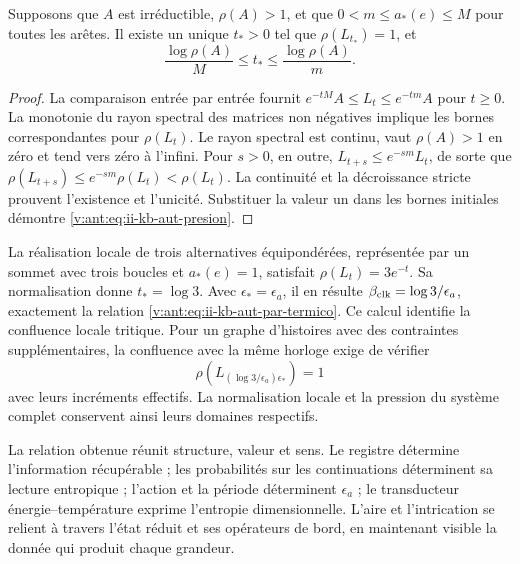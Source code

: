 \begin{proposition}
Supposons que \(A\) est irréductible, \(\rho(A)>1\), et que
\(0<m\leq a_*(e)\leq M\) pour toutes les arêtes. Il existe un unique
\(t_*>0\) tel que \(\rho(L_{t_*})=1\), et
\begin{equation}
 \frac{\log\rho(A)}{M}\leq t_*\leq
 \frac{\log\rho(A)}{m}.
 \label{v:ant:eq:ii-kb-aut-presion}
\end{equation}
\end{proposition}
\begin{proof}
La comparaison entrée par entrée fournit \(e^{-tM}A\leq L_t\leq e^{-tm}A\) pour \(t\geq0\). La monotonie du rayon spectral des matrices non négatives implique les bornes correspondantes pour \(\rho(L_t)\). Le rayon spectral est continu, vaut \(\rho(A)>1\) en zéro et tend vers zéro à l'infini. Pour \(s>0\), en outre, \(L_{t+s}\leq e^{-sm}L_t\), de sorte que \(\rho(L_{t+s})\leq e^{-sm}\rho(L_t)<\rho(L_t)\). La continuité et la décroissance stricte prouvent l'existence et l'unicité. Substituer la valeur un dans les bornes initiales démontre \eqref{v:ant:eq:ii-kb-aut-presion}.
\end{proof}

La réalisation locale de trois alternatives équipondérées, représentée
par un sommet avec trois boucles et \(a_*(e)=1\), satisfait
\(\rho(L_t)=3e^{-t}\). Sa normalisation donne \(t_*=\log3\).
Avec \(\epsilon_*=\epsilon_a\), il en résulte
\(\beta_{\rm clk}=\log3/\epsilon_a\), exactement la relation
\eqref{v:ant:eq:ii-kb-aut-par-termico}. Ce calcul identifie la
confluence locale tritique. Pour un graphe d'histoires avec des contraintes
supplémentaires, la confluence avec la même horloge exige de vérifier
\[
 \rho\!\left(L_{(\log3/\epsilon_a)\epsilon_*}\right)=1
\]
avec leurs incréments effectifs. La normalisation locale et la pression
du système complet conservent ainsi leurs domaines respectifs.

La relation obtenue réunit structure, valeur et sens. Le registre
détermine l’information récupérable ; les probabilités sur les
continuations déterminent sa lecture entropique ; l’action et la période
déterminent \(\epsilon_a\) ; le transducteur énergie--température
exprime l’entropie dimensionnelle. L’aire et l’intrication se
relient à travers l’état réduit et ses opérateurs de bord,
en maintenant visible la donnée qui produit chaque grandeur.
